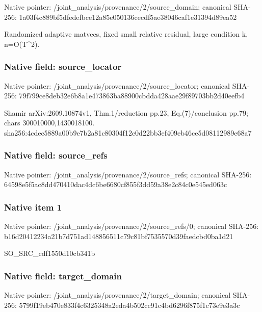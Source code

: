 \documentclass[10pt,a4paper]{article}
\begin{document}
Native pointer: /joint\_analysis/provenan\allowbreak{}ce/2/source\_domain; canonical SHA-256: 1a03f4c889bf5dfedefbce12\allowbreak{}a85e050136cecdf5ae38046c\allowbreak{}af1e31394d89ea52


Randomized adaptive matvecs, fixed small relative residual, large condition k, n=O(T\textasciicircum{}2).


\subsubsection{Native field: source\_locator}


Native pointer: /joint\_analysis/provenan\allowbreak{}ce/2/source\_locator; canonical SHA-256: 79f799ce8deb32e6b8a1e473\allowbreak{}863ba88900cbdda428aae29f\allowbreak{}89703bb2d40eefb4


Shamir arXiv:2609.10874v1, Thm.1/reduction pp.23, Eq.(7)/conclusion pp.79; chars 300010000,1430018100. sha256:4cdec5889a00b9e7b\allowbreak{}2a81c80304f12e0d22bb3ef4\allowbreak{}09eb46ce5d08112989e68a7


\subsubsection{Native field: source\_refs}


Native pointer: /joint\_analysis/provenan\allowbreak{}ce/2/source\_refs; canonical SHA-256: 64598e5f5ac8dd470410dac4\allowbreak{}dc6be6680cf855f3dd59a38e\allowbreak{}2c84c0e545ed063c



\subsubsection{Native item 1}


Native pointer: /joint\_analysis/provenan\allowbreak{}ce/2/source\_refs/0; canonical SHA-256: b16d20412234a21b7d751ad1\allowbreak{}48856511c79c81bf7535570d\allowbreak{}39faedcbd0ba1d21


SO\_SRC\_cdf1550d10cb341b


\subsubsection{Native field: target\_domain}


Native pointer: /joint\_analysis/provenan\allowbreak{}ce/2/target\_domain; canonical SHA-256: 5799f19eb470e833f4c63253\allowbreak{}48a2eda4b502cc91c4bd6296\allowbreak{}f875f1c73e9e3a3c
\end{document}
